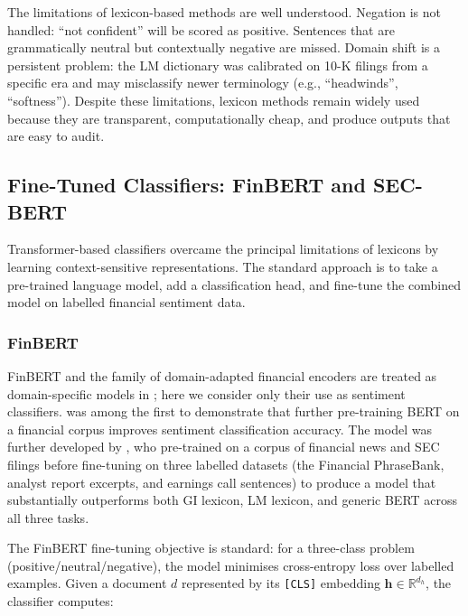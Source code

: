 The limitations of lexicon-based methods are well understood. Negation is not handled: ``not confident'' will be scored as positive. Sentences that are grammatically neutral but contextually negative are missed. Domain shift is a persistent problem: the LM dictionary was calibrated on 10-K filings from a specific era and may misclassify newer terminology (e.g., ``headwinds'', ``softness''). Despite these limitations, lexicon methods remain widely used because they are transparent, computationally cheap, and produce outputs that are easy to audit.

\subsection{Fine-Tuned Classifiers: FinBERT and SEC-BERT}
\label{sec:ch09-finetuned-classifiers}

Transformer-based classifiers overcame the principal limitations of lexicons by learning context-sensitive representations. The standard approach is to take a pre-trained language model, add a classification head, and fine-tune the combined model on labelled financial sentiment data.

\subsubsection*{FinBERT}

FinBERT and the family of domain-adapted financial encoders are treated as
domain-specific models in ; here we consider only their
use as sentiment classifiers. \citet{araci2019finbert} was among the first to demonstrate that further pre-training BERT on a financial corpus improves sentiment classification accuracy. The model was further developed by \citet{huang2023finbert}, who pre-trained on a corpus of financial news and SEC filings before fine-tuning on three labelled datasets (the Financial PhraseBank, analyst report excerpts, and earnings call sentences) to produce a model that substantially outperforms both GI lexicon, LM lexicon, and generic BERT across all three tasks.

The FinBERT fine-tuning objective is standard: for a three-class problem (positive/neutral/negative), the model minimises cross-entropy loss over labelled examples. Given a document $d$ represented by its \texttt{[CLS]} embedding $\mathbf{h} \in \mathbb{R}^{d_h}$, the classifier computes:

